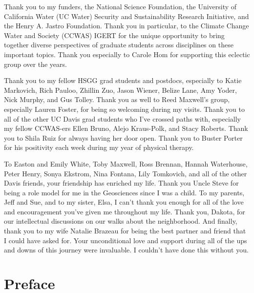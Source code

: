 \begin{frontmatter}
\begin{acknowledgments}
Thank you to my funders, the National Science Foundation, the University of California Water (UC Water) Security and Sustainability Research Initiative, and the Henry A. Jastro Foundation. Thank you in particular, to the Climate Change Water and Society (CCWAS) IGERT for the unique opportunity to bring together diverse perspectives of graduate students across disciplines on these important topics. Thank you especially to Carole Hom for supporting this eclectic group over the years.

Thank you to my fellow HSGG grad students and postdocs, especially to Katie Markovich, Rich Pauloo, Zhillin Zuo, Jason Wiener, Belize Lane, Amy Yoder, Nick Murphy, and Gus Tolley. Thank you as well to Reed Maxwell's group, especially Lauren Foster, for being so welcoming during my visits. Thank you to all of the other UC Davis grad students who I've crossed paths with, especially my fellow CCWAS-ers Ellen Bruno, Alejo Kraus-Polk, and Stacy Roberts. Thank you to Shila Ruiz for always having her door open. Thank you to Buster Porter for his positivity each week during my year of physical therapy.

To Easton and Emily White, Toby Maxwell, Ross Brennan, Hannah Waterhouse, Peter Henry, Sonya Ekstrom, Nina Fontana, Lily Tomkovich, and all of the other Davis friends, your friendship has enriched my life. Thank you Uncle Steve for being a role model for me in the Geosciences since I was a child. To my parents, Jeff and Sue, and to my sister, Elsa, I can't thank you enough for all of the love and encouragement you've given me throughout my life. Thank you, Dakota, for our intellectual discussions on our walks about the neighborhood. And finally, thank you to my wife Natalie Brazeau for being the best partner and friend that I could have asked for. Your unconditional love and support during all of the ups and downs of this journey were invaluable. I couldn't have done this without you.

\end{acknowledgments}

\chapter*{Preface}



\end{frontmatter}
